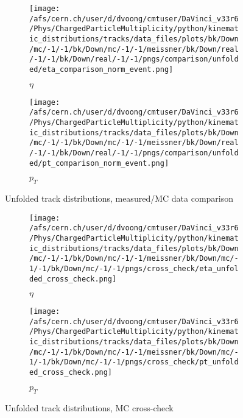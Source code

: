 \begin{figure}[h]
	\begin{subfigure}[h]{0.49\textwidth}
		\texttt{[image: /afs/cern.ch/user/d/dvoong/cmtuser/DaVinci\_v33r6/Phys/ChargedParticleMultiplicity/python/kinematic\_distributions/tracks/data\_files/plots/bk/Down/mc/-1/-1/bk/Down/mc/-1/-1/meissner/bk/Down/real/-1/-1/bk/Down/real/-1/-1/pngs/comparison/unfolded/eta\_comparison\_norm\_event.png]}
		\caption{$\eta$}
		\label{fig: background corrected track distributions eta}
	\end{subfigure}
	\begin{subfigure}[h]{0.49\textwidth}
		\texttt{[image: /afs/cern.ch/user/d/dvoong/cmtuser/DaVinci\_v33r6/Phys/ChargedParticleMultiplicity/python/kinematic\_distributions/tracks/data\_files/plots/bk/Down/mc/-1/-1/bk/Down/mc/-1/-1/meissner/bk/Down/real/-1/-1/bk/Down/real/-1/-1/pngs/comparison/unfolded/pt\_comparison\_norm\_event.png]}
		\caption{$p_T$}
		\label{fig: background corrected track distributions pt}
	\end{subfigure}
	\caption{Unfolded track distributions, measured/MC data comparison}
	\label{fig: unfolded track distributions comparison}
\end{figure}

\begin{figure}[h]
	\begin{subfigure}[h]{0.49\textwidth}
		\texttt{[image: /afs/cern.ch/user/d/dvoong/cmtuser/DaVinci\_v33r6/Phys/ChargedParticleMultiplicity/python/kinematic\_distributions/tracks/data\_files/plots/bk/Down/mc/-1/-1/bk/Down/mc/-1/-1/meissner/bk/Down/mc/-1/-1/bk/Down/mc/-1/-1/pngs/cross\_check/eta\_unfolded\_cross\_check.png]}
		\caption{$\eta$}
		\label{fig: background corrected track distributions eta}
	\end{subfigure}
	\begin{subfigure}[h]{0.49\textwidth}
		\texttt{[image: /afs/cern.ch/user/d/dvoong/cmtuser/DaVinci\_v33r6/Phys/ChargedParticleMultiplicity/python/kinematic\_distributions/tracks/data\_files/plots/bk/Down/mc/-1/-1/bk/Down/mc/-1/-1/meissner/bk/Down/mc/-1/-1/bk/Down/mc/-1/-1/pngs/cross\_check/pt\_unfolded\_cross\_check.png]}
		\caption{$p_T$}
		\label{fig: background corrected track distributions pt}
	\end{subfigure}
	\caption{Unfolded track distributions, MC cross-check}
	\label{fig: unfolded track distributions cross-check}
\end{figure}

